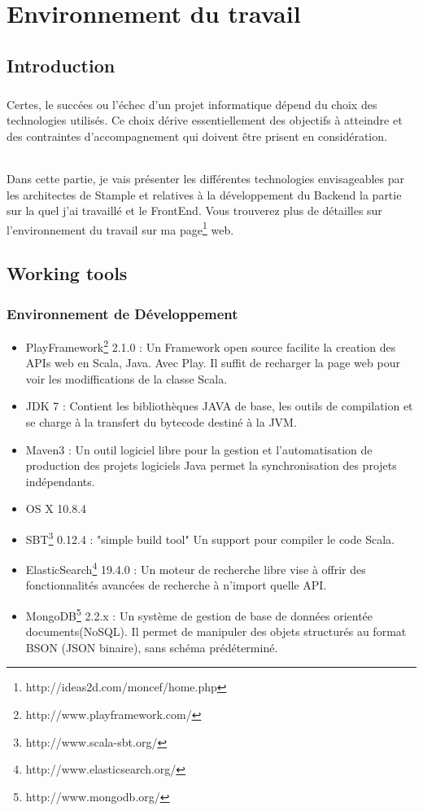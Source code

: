 \chapter{Environnement du travail}
\section{Introduction}
\paragraph{}
Certes, le succées ou l'échec d'un projet informatique dépend du choix des technologies utilisés.
Ce choix dérive essentiellement des objectifs à atteindre et des contraintes d'accompagnement qui doivent être prisent en considération.
\subparagraph{}
Dans cette partie, je vais présenter les différentes technologies envisageables par les architectes de Stample 
et relatives à la développement du Backend la partie sur la quel j'ai travaillé et le FrontEnd.
Vous trouverez plus de détailles sur l'environnement du travail sur ma page\footnote{http://ideas2d.com/moncef/home.php} web.
\section{Working tools}
\subsection{Environnement de Développement}
\begin{itemize}
\item PlayFramework\footnote{http://www.playframework.com/} 2.1.0 : Un Framework open source facilite la creation des APIs web en Scala, Java. Avec Play. Il suffit de recharger la page web pour voir les modiffications de la classe Scala.
\item JDK 7 : Contient les bibliothèques JAVA de base, les outils de compilation et se charge à la transfert du bytecode destiné à la JVM. 
\item Maven3 : Un outil logiciel libre pour la gestion et l'automatisation de production des projets logiciels Java permet la synchronisation des projets indépendants.
\item OS X 10.8.4
\item SBT\footnote{http://www.scala-sbt.org/} 0.12.4 : "simple build tool" Un support pour compiler le code Scala.
\item ElasticSearch\footnote{http://www.elasticsearch.org/} 19.4.0 :  Un moteur de recherche libre vise à offrir des fonctionnalités avancées de recherche à n'import quelle API.
\item MongoDB\footnote{http://www.mongodb.org/} 2.2.x : Un système de gestion de base de données orientée documents(NoSQL). Il permet de manipuler des objets structurés au format BSON (JSON binaire), sans schéma prédéterminé.
\end{itemize}
